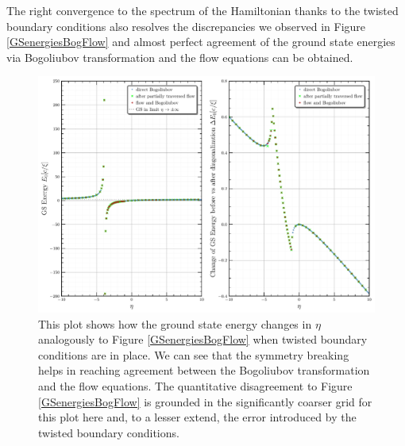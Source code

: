 The right convergence to the spectrum of the Hamiltonian thanks to the twisted boundary conditions also resolves the discrepancies we observed in Figure \ref{GSenergiesBogFlow} and almost perfect agreement of the ground state energies via Bogoliubov transformation and the flow equations can be obtained.
\begin{figure}[H]
    \centering
    \includegraphics[width=\textwidth]{figures/plots/PDF/GS_energies_bog_flow_comp_N=40.pdf}
    \caption[Ground state energy with twisted boundary conditions]{This plot shows how the ground state energy changes in $\eta$ analogously to Figure \ref{GSenergiesBogFlow} when twisted boundary conditions are in place. We can see that the symmetry breaking helps in reaching agreement between the Bogoliubov transformation and the flow equations. The quantitative disagreement to Figure \ref{GSenergiesBogFlow} is grounded in the significantly coarser grid for this plot here and, to a lesser extend, the error introduced by the twisted boundary conditions.}
    \label{ConvergenceImprovementsTwisted}
\end{figure}


